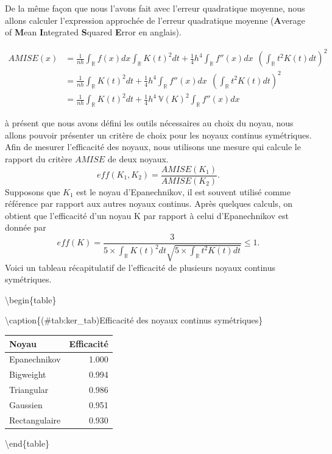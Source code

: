 \documentclass[
]{book}
\begin{document}
De la même façon que nous l'avons fait avec l'erreur quadratique moyenne, nous allons calculer l'expression approchée de l'erreur quadratique moyenne (\textbf{A}verage of \textbf{M}ean \textbf{I}ntegrated \textbf{S}quared \textbf{E}rror en anglais).

\[
\begin{aligned}
AMISE(x)&= \frac1{nh} \int_{\mathbb R}f(x)dx \int_{\mathbb R}K(t)^2 dt + \frac14h^4 \int_{\mathbb R}f''(x)dx ~~\left(\int_{\mathbb R} t^2K(t) dt \right)^2\\
&= \frac1{nh} \int_{\mathbb R}K(t)^2 dt 
+ \frac14h^4 \int_{\mathbb R}f''(x)dx ~~\left(\int_{\mathbb R} t^2K(t) dt \right)^2\\
&= \frac1{nh} \int_{\mathbb R}K(t)^2 dt 
+ \frac14h^4 ~ \mathbb V (K)^2 \int_{\mathbb R}f''(x)dx 
\end{aligned}
\]

\hspace*{0.5cm} à présent que nous avons défini les outils nécessaires au choix du noyau, nous allons pouvoir présenter un critère de choix pour les noyaux continus symétriques. Afin de mesurer l'efficacité des noyaux, nous utilisons une mesure qui calcule le rapport du critère \(AMISE\) de deux noyaux.
\[
eff(K_1,K_2) = \frac{AMISE(K_1)}{AMISE(K_2)}.
\]
Supposons que \(K_1\) est le noyau d'Epanechnikov, il est souvent utilisé comme référence par rapport aux autres noyaux continus. Après quelques calculs, on obtient que l'efficacité d'un noyau K par rapport à celui d'Epanechnikov est donnée par
\[
eff(K) = \frac{3}{5\times \int_{\mathbb R}K(t)^2 dt\sqrt{5 \times\int_{\mathbb R}t^2K(t) dt} } \leq1.
\]
Voici un tableau récapitulatif de l'efficacité de plusieurs noyaux continus symétriques.

\textbackslash begin\{table\}

\textbackslash caption\{(\#tab:ker\_tab)Efficacité des noyaux continus symétriques\}
\centering

\begin{tabular}[t]{l|r}
\hline
Noyau & Efficacité\\
\hline
Epanechnikov & 1.000\\
\hline
Bigweight & 0.994\\
\hline
Triangular & 0.986\\
\hline
Gaussien & 0.951\\
\hline
Rectangulaire & 0.930\\
\hline
\end{tabular}

\textbackslash end\{table\}
\end{document}
